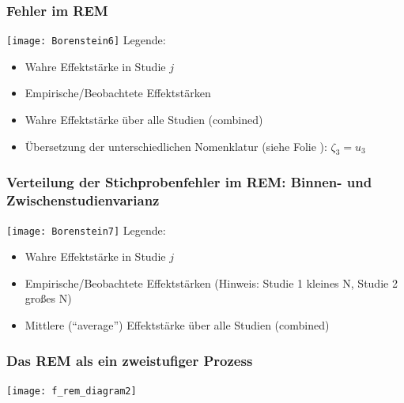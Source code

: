 \begin{frame}[shrink = 5]
  \frametitle{Fehler im REM}
  \texttt{[image: Borenstein6]}
  \newline
  Legende:
  \begin{itemize}
  \item[\FilledSmallCircle] Wahre Effektstärke in Studie $j$
  \item[\FilledSmallSquare] Empirische/Beobachtete Effektstärken
  \item[\FilledSmallTriangleDown] Wahre Effektstärke über alle Studien (combined)
  \item Übersetzung der unterschiedlichen Nomenklatur (siehe Folie \pageref{slide:fem-refm-fehler}): $\zeta_3 = u_3$
  \end{itemize}
  \citep[Quelle: ][71]{borenstein_introduction_2009}
\end{frame}


\begin{frame}[shrink = 5]
  \frametitle{Verteilung der Stichprobenfehler im REM: Binnen- und Zwischenstudienvarianz}
  \texttt{[image: Borenstein7]}
  \newline
  Legende:
  \begin{itemize}
  \item[\FilledSmallCircle] Wahre Effektstärke in Studie $j$
  \item[\FilledSmallSquare] Empirische/Beobachtete Effektstärken (Hinweis: Studie 1 kleines N, Studie 2 großes N)
  \item[\FilledSmallTriangleDown] Mittlere ("`average"') Effektstärke über alle Studien (combined)
  \end{itemize}
  \citep[Quelle: ][71]{borenstein_introduction_2009}
\end{frame}


\begin{frame}[plain]
  \frametitle{Das REM als ein zweistufiger Prozess}
  \texttt{[image: f\_rem\_diagram2]}


\citep[Quelle: ][]{thompson_introduction_2013, viechtbauer_accounting_2007}


\end{frame}





